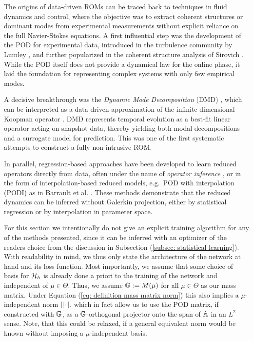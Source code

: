 \begin{remark}
    The origins of data-driven ROMs can be traced back to techniques in fluid 
    dynamics and control, where the objective was to extract coherent structures 
    or dominant modes from experimental measurements without explicit reliance on 
    the full Navier-Stokes equations. A first influential step was the development 
    of the POD for experimental data, 
    introduced in the turbulence community by Lumley \cite{lumley1967}, and further 
    popularized in the coherent structure analysis of Sirovich \cite{sirovich1987}. 
    While the POD itself does not provide a dynamical law for the online phase, it laid the foundation for 
    representing complex systems with only few empirical modes.

    A decisive breakthrough was the 
    \emph{Dynamic Mode Decomposition} (DMD) \cite{schmid2010}, which can be 
    interpreted as a data-driven approximation of the infinite-dimensional Koopman 
    operator \cite{rowley2009}. DMD represents temporal evolution as a best-fit 
    linear operator acting on snapshot data, thereby yielding both modal 
    decompositions and a surrogate model for prediction. This was one of the first 
    systematic attempts to construct a fully non-intrusive ROM.

    In parallel, regression-based approaches have been developed to learn reduced 
    operators directly from data, often under the name of 
    \emph{operator inference} \cite{peherstorfer2018}, or in the form of 
    interpolation-based reduced models, e.g.\ POD with interpolation (PODI) 
    as in Barrault et al. \cite{barrault2004}. These methods demonstrate that the 
    reduced dynamics can be inferred without Galerkin projection, either by 
    statistical regression or by interpolation in parameter space.
\end{remark}

For this section we intentionally do not give an explicit training algorithm for any of the methods presented,
since it can be inferred with an optimizer of the readers choice from the discussion 
in Subsection (\ref{subsec: statistical learning}). With readability in mind, we thus only state the architecture
of the network at hand and its loss function. Most importantly, we assume that some choice of basis
for $\mathcal{H}_h$ is already done a priori to the training of the network and independent of $\mu \in \Theta$.
Thus, we assume $\mathbb{G} := M(\mu)$ for all $\mu \in \Theta$ as our mass matrix. Under Equation
(\ref{eq: definition mass matrix norm}) this also implies a $\mu$-independent norm $\lVert \cdot \rVert$, which in fact
allow us to use the POD matrix, if constructed with $\mathbb{G}$, as a $\mathbb{G}$-orthogonal projector 
onto the span of $\mathbb{A}$ in an $L^2$ sense.
Note, that this could be relaxed, if a general equivalent norm would be known without imposing a $\mu$-independent
basis.

